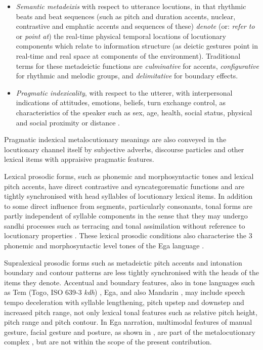 \documentclass[output=paper,colorlinks,citecolor=brown]{langscibook}
\begin{document}
\begin{itemize}
\item \textit{Semantic metadeixis} with respect to utterance locutions, in that rhythmic beats and beat sequences (such as pitch and duration accents, nuclear, contrastive and emphatic accents and sequences of these) \textit{denote} (or: \textit{refer to} or \textit{point at}) the real-time physical temporal locations of locutionary components which relate to information structure (as deictic gestures point in real-time and real space at components of the environment). Traditional terms for these metadeictic functions are \textit{culminative} for accents, \textit{configurative} for rhythmic and melodic groups, and \textit{delimitative} for boundary effects.
\item \textit{Pragmatic indexicality}, with respect to the utterer, with interpersonal indications of attitudes, emotions, beliefs, turn exchange control, as characteristics of the speaker such as sex, age, health, social status, physical and social proximity or distance \citep{gibbon1976, hirschbergpierrehumbert1986}.
\end{itemize}
Pragmatic indexical metalocutionary meanings are also conveyed in the locutionary channel itself by subjective adverbs, discourse particles and other lexical items with appraisive pragmatic features.

Lexical prosodic forms, such as phonemic and morphosyntactic tones and lexical pitch accents, have direct contrastive and syncategorematic functions and are tightly synchronised with head syllables of locutionary lexical items. In addition to some direct influence from segments, particularly consonants, tonal forms are partly independent of syllable components in the sense that they may undergo sandhi processes such as terracing and tonal assimilation without reference to locutionary properties \citep{gibbonfstone1987, jansche1998}. These lexical prosodic conditions also characterise the 3 phonemic and morphosyntactic level tones of the Ega language \citep{connellahouagibbon2002}.

Supralexical prosodic forms such as metadeictic pitch accents and intonation boundary and contour patterns are less tightly synchronised with the heads of the items they denote. Accentual and boundary features, also in tone languages such as Tem (Togo, ISO 639-3 \textit{kdh}) \citep{tchagbale2001}, Ega, and also Mandarin \citep{duanmu2007}, may include speech tempo deceleration with syllable lengthening, pitch upstep and downstep and increased pitch range, not only lexical tonal features such as relative pitch height, pitch range and pitch contour. In Ega narration, multimodal features of manual gesture, facial gesture and posture, as shown in , are part of the metalocutionary complex \citep{rossinigibbon2011}, but are not within the scope of the present contribution.
\end{document}
